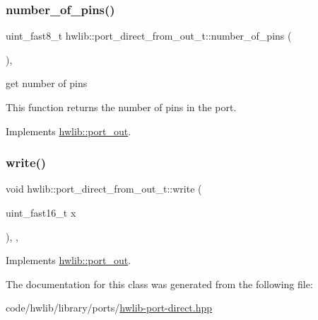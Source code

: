 \subsubsection{\texorpdfstring{number\+\_\+of\+\_\+pins()}{number\_of\_pins()}}
{\footnotesize\ttfamily uint\+\_\+fast8\+\_\+t hwlib\+::port\+\_\+direct\+\_\+from\+\_\+out\+\_\+t\+::number\+\_\+of\+\_\+pins (\begin{DoxyParamCaption}{ }\end{DoxyParamCaption})\hspace{0.3cm}{\ttfamily [inline]}, {\ttfamily [virtual]}}





get number of pins

This function returns the number of pins in the port. 

Implements \hyperlink{classhwlib_1_1port__out_a8593e2ff755b938797defb06c1e085df}{hwlib\+::port\+\_\+out}.

\mbox{\label{classhwlib_1_1port__direct__from__out__t_a1548ef3dcb6d110a5b58e3698325ca11}} 
\subsubsection{\texorpdfstring{write()}{write()}}
{\footnotesize\ttfamily void hwlib\+::port\+\_\+direct\+\_\+from\+\_\+out\+\_\+t\+::write (\begin{DoxyParamCaption}\item[{uint\+\_\+fast16\+\_\+t}]{x }\end{DoxyParamCaption})\hspace{0.3cm}{\ttfamily [inline]}, {\ttfamily [override]}, {\ttfamily [virtual]}}







Implements \hyperlink{classhwlib_1_1port__out_a3644bf484ebe059ec5bf17fa43e0c01b}{hwlib\+::port\+\_\+out}.



The documentation for this class was generated from the following file\+:\begin{DoxyCompactItemize}
\item 
code/hwlib/library/ports/\hyperlink{hwlib-port-direct_8hpp}{hwlib-\/port-\/direct.\+hpp}\end{DoxyCompactItemize}
